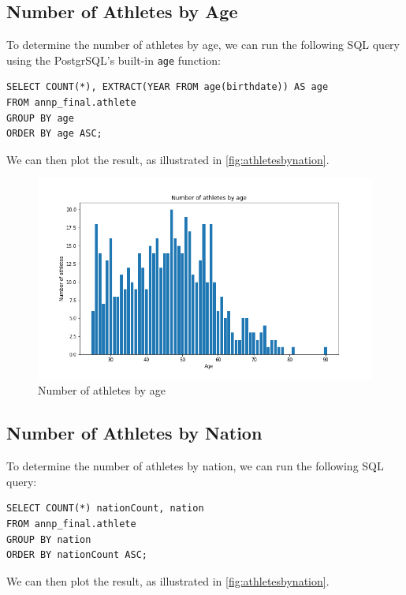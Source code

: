 \subsection{Number of Athletes by Age}\label{subsec:number-of-athletes-by-age}

To determine the number of athletes by age, we can run the following SQL query using the PostgrSQL's built-in
\texttt{age} function:

\begin{verbatim}
SELECT COUNT(*), EXTRACT(YEAR FROM age(birthdate)) AS age
FROM annp_final.athlete
GROUP BY age
ORDER BY age ASC;
\end{verbatim}

We can then plot the result, as illustrated in \cref{fig:athletesbynation}.

\begin{figure}[H]
    \centering
    \includegraphics[width=\textwidth]{img/athletesbyage}
    \caption{Number of athletes by age}
    \label{fig:athletesbyage}
\end{figure}

\subsection{Number of Athletes by Nation}\label{subsec:number-of-athletes-by-nation}

To determine the number of athletes by nation, we can run the following SQL query:

\begin{verbatim}
SELECT COUNT(*) nationCount, nation
FROM annp_final.athlete
GROUP BY nation
ORDER BY nationCount ASC;
\end{verbatim}

We can then plot the result, as illustrated in \cref{fig:athletesbynation}.

